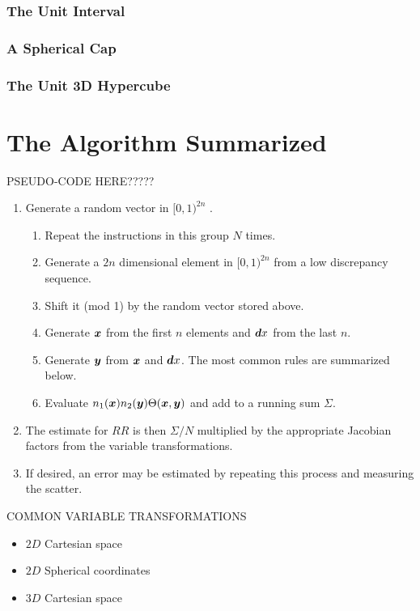 \documentclass[usenatbib]{mn2e}
\begin{document}
\subsubsection{The Unit Interval}

\subsubsection{A Spherical Cap}

\subsubsection{The Unit 3D Hypercube}

\section{The Algorithm Summarized}
\label{sec:alg}

PSEUDO-CODE HERE?????
\begin{enumerate}
  \item Generate a random vector in $[0,1)^{2n}$ .
  \begin{enumerate}
    \item Repeat the instructions in this group $N$ times.
    \item Generate a $2n$ dimensional element in $[0,1)^{2n}$ from a low
    discrepancy sequence.
    \item Shift it (mod 1) by the random vector stored above.
    \item Generate ${\bm x}$ from the first $n$ elements and ${\bm dx}$ from the last
    $n$.
    \item Generate ${\bm y}$ from ${\bm x}$ and ${\bm dx}$. The most common rules are
    summarized below.
    \item Evaluate $n_1({\bm x}) n_2({\bm y}) \Theta({\bm x}, {\bm y})$ and add to a running sum
    $\Sigma$.
  \end{enumerate}
  \item The estimate for $RR$ is then $\Sigma/N$ multiplied by the appropriate
  Jacobian factors from the variable transformations. 
  \item If desired, an error may be estimated by repeating this process and
  measuring the scatter. 
\end{enumerate}

COMMON VARIABLE TRANSFORMATIONS
\begin{itemize}
  \item $2D$ Cartesian space
  \item $2D$ Spherical coordinates
  \item $3D$ Cartesian space
\end{itemize}
\end{document}
